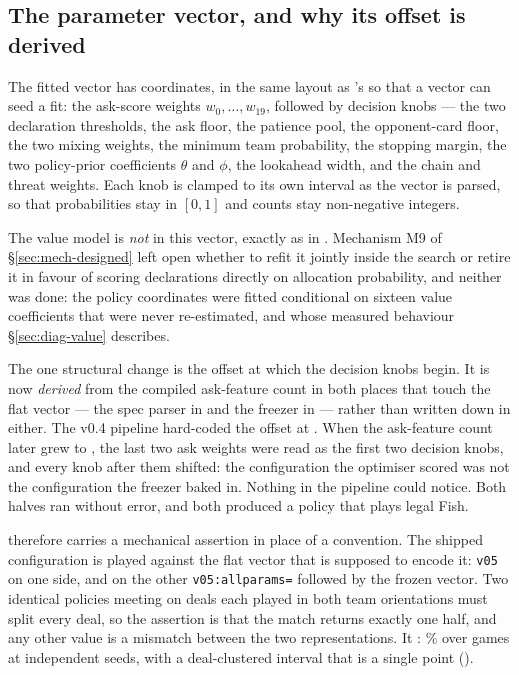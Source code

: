 \subsection{The parameter vector, and why its offset is derived}
\label{sec:fit-vector}

The fitted vector has \numFitDims{} coordinates, in the same layout as
\vfour{}'s so that a \vfour{} vector can seed a \vfive{} fit: the
\numFitAskFeats{} ask-score weights $w_0,\dots,w_{19}$, followed by
\numFitKnobs{} decision knobs --- the two declaration thresholds, the ask floor,
the patience pool, the opponent-card floor, the two mixing weights, the minimum
team probability, the stopping margin, the two policy-prior coefficients $\theta$
and $\phi$, the lookahead width, and the chain and threat weights. Each knob is
clamped to its own interval as the vector is parsed, so that probabilities stay
in $[0,1]$ and counts stay non-negative integers.

The value model is \emph{not} in this vector, exactly as in \vfour{}. Mechanism
M9 of \S\ref{sec:mech-designed} left open whether to refit it jointly inside the
search or retire it in favour of scoring declarations directly on allocation
probability, and neither was done: the \numFitDims{} policy coordinates were
fitted conditional on sixteen value coefficients that were never re-estimated,
and whose measured behaviour \S\ref{sec:diag-value} describes.

The one structural change is the offset at which the decision knobs begin. It is
now \emph{derived} from the compiled ask-feature count in both places that touch
the flat vector --- the spec parser in  and the
freezer in  --- rather than written down in
either. The v0.4 pipeline hard-coded the offset at \numAliasOffset{}. When the
ask-feature count later grew to \numFitAskFeats{}, the last two ask weights were
read as the first two decision knobs, and every knob after them shifted: the
configuration the optimiser scored was not the configuration the freezer baked
in. Nothing in the pipeline could notice. Both halves ran without error, and both
produced a policy that plays legal Fish.

\vfive{} therefore carries a mechanical assertion in place of a convention. The
shipped configuration is played against the flat vector that is supposed to
encode it: \texttt{v05} on one side, and on the other \texttt{v05:allparams=}
followed by the frozen vector. Two identical policies meeting on deals each played in
both team orientations must split every deal, so the assertion is that the match
returns exactly one half, and any other value is a mismatch between the two
representations. It \numRoundTripPass{}: \numRoundTrip\% over
\numRoundTripGames{} games at \numRoundTripSeeds{} independent seeds, with a
deal-clustered interval that is a single point
().

